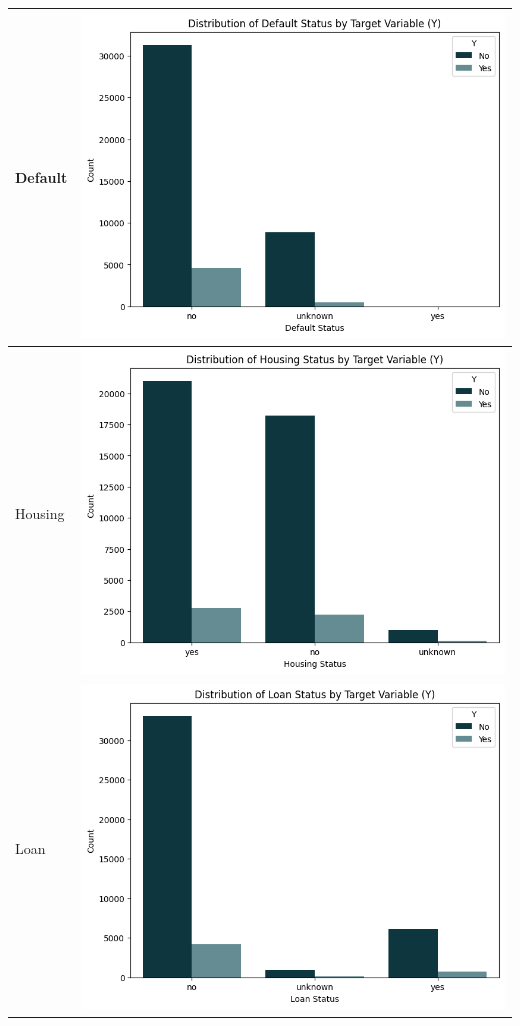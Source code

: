 \documentclass{article}
\begin{document}
\begin{longtable}{|l|c|}
               Default & \includegraphics[width=0.7\linewidth]{data/bank_marketing/pic/Bank_Add_def.png} \\ \hline
               Housing & \includegraphics[width=0.7\linewidth]{data/bank_marketing/pic/Bank_Add_Hous.png} \\ \hline
               Loan & \includegraphics[width=0.7\linewidth]{data/bank_marketing/pic/Bank_Add_loan.png} \\ \hline

\end{longtable}
\end{document}
